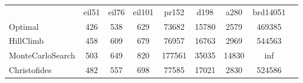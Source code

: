 \begin{tabular}[ht]{|l||c|c|c|c|c|c|c|H}
 & eil51 & eil76 & eil101 & pr152 & d198 & a280 & brd14051 & \\  
Optimal &426 & 538 & 629 & 73682 & 15780 & 2579 & 469385 & \\ 
HillClimb &458 & 609 & 679 & 76957 & 16763 & 2969 & 544563 & \\ 
MonteCarloSearch &503 & 649 & 820 & 177561 & 35035 & 14830 & inf & \\ 
Christofides &482 & 557 & 698 & 77585 & 17021 & 2830 & 524586 & \\ 
\end{tabular}